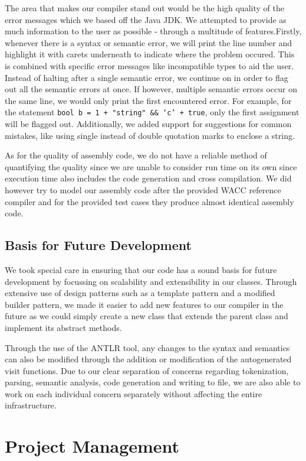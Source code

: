 \documentclass[11pt,a4paper]{article}
\begin{document}
The area that makes our compiler stand out would be the high quality of the error messages which we based off the Java JDK. We attempted to provide as much information to the user as possible - through a multitude of features.Firstly, whenever there is a syntax or semantic error, we will print the line number and highlight it with carets underneath to indicate where the problem occured. This is combined with specific error messages like incompatible types to aid the user. Instead of halting after a single semantic error, we continue on in order to flag out all the semantic errors at once. If however, multiple semantic errors occur on the same line, we would only print the first encountered error. For example, for the statement \texttt{bool b = 1 + "string" \&\& ‘c’ + true}, only the first assignment will be flagged out. Additionally, we added support for suggestions for common mistakes, like using single instead of double quotation marks to enclose a string.

As for the quality of assembly code, we do not have a reliable method of quantifying the quality since we are unable to consider run time on its own since execution time also includes the code generation and cross compilation. We did however try to model our assembly code after the provided WACC reference compiler and for the provided test cases they produce almost identical assembly code. 

\subsection{Basis for Future Development}
We took special care in ensuring that our code has a sound basis for future development by focussing on scalability and extensibility in our classes. Through extensive use of design patterns such as a template pattern and a modified builder pattern, we made it easier to add new features to our compiler in the future as we could simply create a new class that extends the parent class and implement its abstract methods. 

Through the use of the ANTLR tool, any changes to the syntax and semantics can also be modified through the addition or modification of the autogenerated visit functions. Due to our clear separation of concerns regarding tokenization, parsing, semantic analysis, code generation and writing to file, we are also able to work on each individual concern separately without affecting the entire infrastructure. 


\section{Project Management}
\end{document}
